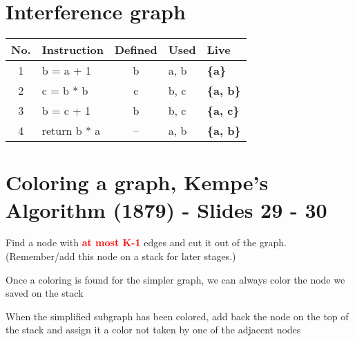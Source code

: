 \documentclass{report}
\newcommand{\textr}[1]{\textcolor{red}{#1}}
\newcommand{\textbfr}[1]{\textbf{\textr{#1}}}
\begin{document}
\section{Interference graph}
\vspace{-1em}
\begin{multicols}{2}
\begin{tabular}{c|l|c|l|>{\bfseries}l}
  \textbf{No.} & \textbf{Instruction} & \textbf{Defined} & \textbf{Used} & \textbf{Live} \\
  \hline
   1  & b = a + 1    & b  & a, b & \{a\}    \\
   2  & c = b * b    & c  & b, c & \{a, b\} \\
   3  & b = c + 1    & b  & b, c & \{a, c\} \\
   4  & return b * a & -- & a, b & \{a, b\} \\
\end{tabular}
\vfill\columnbreak
\end{multicols}


\vspace{-2em}
\section{Coloring a graph, Kempe's Algorithm (1879) - Slides 29 - 30}
\begin{description}[style=multiline,leftmargin=9em]
  \item [\textr{Step 1 (simplify):}] Find a node with \textbfr{at most K-1} edges and cut it out of the graph. \\
  (Remember/add this node on a stack for later stages.)
  \item [Note:] Once a coloring is found for the simpler graph, we can always color the node we saved on the stack
  \item [\textr{Step 2 (color):}] When the simplified subgraph has been colored, add back the node on the top of the stack and assign it a color not taken by one of the adjacent nodes
\end{description}
\end{document}
